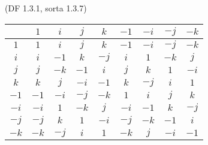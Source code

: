 \begin{problem}{\textsf{(DF 1.3.1, sorta 1.3.7)}}
\begin{enumalph}
\begin{Answer}
      \begin{tabular}{c c c c c c c c c }
        \toprule
          & $1$ & $i$ & $j$ & $k$ & $-1$ & $-i$ & $-j$ & $-k$ \\
        \midrule
          $1$ & $1$ & $i$ & $j$ & $k$ & $-1$ & $-i$ & $-j$ & $-k$ \\
          $i$ & $i$ & $-1$ & $k$ & $-j$ & $i$ & $1$ & $-k$ & $j$ \\
          $j$ & $ j $ & $-k$ & $-1$ & $i$ & $j$ & $k$ & $1$ & $-i$ \\
          $k$ & $k$ & $j$ & $-i$ & $-1$ & $k$ & $-j$ & $i$ & $1$ \\
          $-1$ & $-1$ & $-i$ & $-j$ & $-k$ & $1$ & $i$ & $j$ & $k$ \\
          $-i$ & $-i$ & $1$ & $-k$ & $j$ & $-i$ & $-1$ & $k$ & $-j$ \\
          $-j$ & $-j$ & $k$ & $1$ & $-i$ & $-j$ & $-k$ & $-1$ & $i$ \\
          $-k$ & $-k$ & $-j$ & $i$ & $1$ & $-k$ & $j$ & $-i$ & $-1$ \\
        \bottomrule
      \end{tabular}


\end{Answer}
\end{enumalph}
\end{problem}
